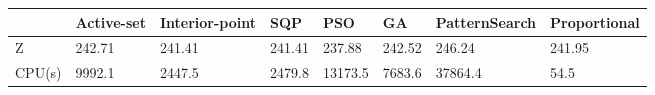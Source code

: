 \begin{tabular}{llllllll}
& Active-set & Interior-point & SQP & PSO & GA & PatternSearch & Proportional \\ 
\hline 
Z & 242.71 & 241.41 & 241.41 & 237.88 & 242.52 & 246.24 & 241.95 \\ 
CPU(s) & 9992.1 & 2447.5 & 2479.8 & 13173.5 & 7683.6 & 37864.4 & 54.5 \\ 
\hline 
\end{tabular}